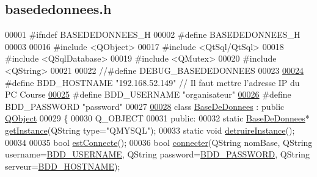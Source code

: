 \hypertarget{basededonnees_8h_source}{}\subsection{basededonnees.\+h}
\label{basededonnees_8h_source}

\begin{DoxyCode}
00001 \textcolor{preprocessor}{#ifndef BASEDEDONNEES\_H}
00002 \textcolor{preprocessor}{#define BASEDEDONNEES\_H}
00003 
00016 \textcolor{preprocessor}{#include <QObject>}
00017 \textcolor{preprocessor}{#include <QtSql/QtSql>}
00018 \textcolor{preprocessor}{#include <QSqlDatabase>}
00019 \textcolor{preprocessor}{#include <QMutex>}
00020 \textcolor{preprocessor}{#include <QString>}
00021 
00022 \textcolor{comment}{//#define DEBUG\_BASEDEDONNEES}
00023 
\hyperlink{basededonnees_8h_af06096ec4ec654090fa78ab359d4a0dd}{00024} \textcolor{preprocessor}{#define BDD\_HOSTNAME        "192.168.52.149" // Il faut mettre l'adresse IP du PC Course}
\hyperlink{basededonnees_8h_a88b5f5b81fa534553c68802384beff2c}{00025} \textcolor{preprocessor}{#define BDD\_USERNAME        "organisateur"}
\hyperlink{basededonnees_8h_ae2ded9166ed2553182545e97514c04f7}{00026} \textcolor{preprocessor}{#define BDD\_PASSWORD        "password"}
00027 
\hyperlink{class_base_de_donnees}{00028} \textcolor{keyword}{class }\hyperlink{class_base_de_donnees}{BaseDeDonnees} : \textcolor{keyword}{public} \hyperlink{class_q_object}{QObject}
00029 \{
00030     Q\_OBJECT
00031     \textcolor{keyword}{public}:
00032         \textcolor{keyword}{static} \hyperlink{class_base_de_donnees}{BaseDeDonnees}* \hyperlink{class_base_de_donnees_a80028aa2b6b4fbf30fb2e36357b7d3d3}{getInstance}(QString type=\textcolor{stringliteral}{"QMYSQL"});
00033         \textcolor{keyword}{static} \textcolor{keywordtype}{void} \hyperlink{class_base_de_donnees_a457401c0816b888c77ce915997545f4e}{detruireInstance}();
00034 
00035         \textcolor{keywordtype}{bool} \hyperlink{class_base_de_donnees_a00388973f3ec42e5c8e76e7af7e124b2}{estConnecte}();
00036         \textcolor{keywordtype}{bool} \hyperlink{class_base_de_donnees_ab2e092285ccc0ee1cce61a1774218561}{connecter}(QString nomBase, QString username=\hyperlink{basededonnees_8h_a88b5f5b81fa534553c68802384beff2c}{BDD\_USERNAME}, QString 
      password=\hyperlink{basededonnees_8h_ae2ded9166ed2553182545e97514c04f7}{BDD\_PASSWORD}, QString serveur=\hyperlink{basededonnees_8h_af06096ec4ec654090fa78ab359d4a0dd}{BDD\_HOSTNAME});

\end{DoxyCode}
